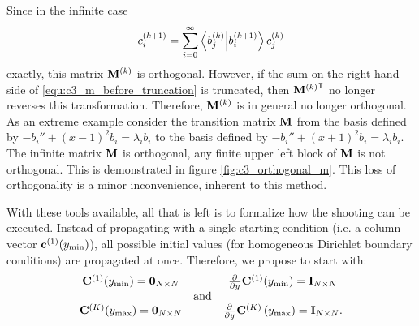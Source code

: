 Since in the infinite case
\begin{equation}\label{equ:c3_m_before_truncation}
  c^{(k+1)}_i = \sum_{i=0}^{\infty} \bra{b_j^{(k)}}\ket{b_i^{(k+1)}} c^{(k)}_j
\end{equation}
exactly, this matrix $\vb{M}^{(k)}$ is orthogonal. However, if the sum on the right hand-side of \eqref{equ:c3_m_before_truncation} is truncated, then ${\vb{M}^{(k)}}^\intercal$ no longer reverses this transformation. Therefore, $\vb{M}^{(k)}$ is in general no longer orthogonal. As an extreme example consider the transition matrix $\vb{M}$ from the basis defined by $-b_i'' + (x-1)^2 b_i = \lambda_i b_i$ to the basis defined by $-b_i'' + (x+1)^2 b_i = \lambda_i b_i$. The infinite matrix $\vb{M}$ is orthogonal, any finite upper left block of $\vb{M}$ is not orthogonal. This is demonstrated in figure \ref{fig:c3_orthogonal_m}. This loss of orthogonality is a minor inconvenience, inherent to this method.

With these tools available, all that is left is to formalize how the shooting can be executed. Instead of propagating with a single starting condition (i.e. a column vector $\vb{c}^{(1)}({y_{\text{min}}})$), all possible initial values (for homogeneous Dirichlet boundary conditions) are propagated at once. Therefore, we propose to start with:
$$
  \begin{matrix}
    \vb{C}^{(1)}({y_{\text{min}}}) = \vb{0}_{N\times N} &            & {\pdv[]{}{y}}\vb{C}^{(1)}({y_{\text{min}}}) = \vb{I}_{N\times N}                    \\
                                             & \text{and} &                                                                          \\
    \vb{C}^{(K)}({y_{\text{max}}}) = \vb{0}_{N\times N} &            & {\pdv[]{}{y}}\vb{C}^{(K)}\left({y_{\text{max}}}\right) = \vb{I}_{N\times N}\text{.}
  \end{matrix}
$$

